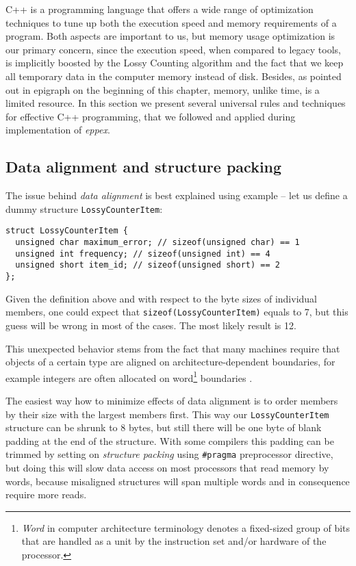C++ is a programming language that offers a wide range of optimization techniques to
tune up both the execution speed and memory requirements of a program.
Both aspects are important to us, but memory usage optimization is our primary concern,
since the execution speed, when compared to legacy tools, is implicitly boosted by
the Lossy Counting algorithm and the fact that we keep all temporary data in the computer
memory instead of disk.
Besides, as pointed out in epigraph on the beginning of this chapter, memory, unlike time,
is a limited resource.
In this section we present several universal rules and techniques for effective C++
programming, that we followed and applied during implementation of \emph{eppex}.

\subsection{Data alignment and structure packing}

The issue behind \emph{data alignment} is best explained using example
-- let us define a dummy structure \texttt{LossyCounterItem}:

\begin{verbatim}
struct LossyCounterItem {
  unsigned char maximum_error; // sizeof(unsigned char) == 1
  unsigned int frequency; // sizeof(unsigned int) == 4
  unsigned short item_id; // sizeof(unsigned short) == 2
};
\end{verbatim}

Given the definition above and with respect to the byte sizes of individual members,
one could expect that \texttt{sizeof(LossyCounterItem)} equals to 7, but this guess
will be wrong in most of the cases. The most likely result is 12.

This unexpected behavior stems from the fact that many machines require that
objects of a certain type are aligned on architecture-dependent boundaries,
for example integers are often allocated on word\footnote{\emph{Word} in computer
architecture terminology denotes a fixed-sized group of bits that are handled
as a unit by the instruction  set and/or hardware of the processor.} boundaries
\citep[Chapter 5]{stroustrup:cplusplus}.

The easiest way how to minimize effects of data alignment is to order members
by their size with the largest members first.
This way our \texttt{LossyCounterItem} structure can be shrunk to 8 bytes,
but still there will be one byte of blank padding at the end of the structure.
With some compilers this padding can be trimmed by setting on \emph{structure packing}
using \texttt{\#pragma} preprocessor directive, but doing this will slow data access
on most processors that read memory by words, because misaligned structures will span
multiple words and in consequence require more reads.

